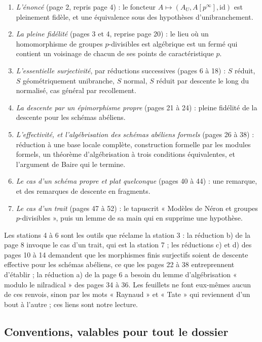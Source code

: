 \documentclass[11pt,a4paper]{article}
\begin{document}
\begin{enumerate}
  \item \emph{L'énoncé} (page 2, repris page 4) : le foncteur
  $A \mapsto (A_U, A[p^\infty], \mathrm{id})$ est pleinement fidèle, et une
  équivalence sous des hypothèses d'unibranchement.
  \item \emph{La pleine fidélité} (pages 3 et 4, reprise page 20) : le lieu où
  un homomorphisme de groupes $p$-divisibles est algébrique est un fermé qui
  contient un voisinage de chacun de ses points de caractéristique $p$.
  \item \emph{L'essentielle surjectivité}, par réductions successives (pages 6
  à 18) : $S$ réduit, $S$ géométriquement unibranche, $S$ normal, $S$ réduit
  par descente le long du normalisé, cas général par recollement.
  \item \emph{La descente par un épimorphisme propre} (pages 21 à 24) : pleine
  fidélité de la descente pour les schémas abéliens.
  \item \emph{L'effectivité, et l'algébrisation des schémas abéliens formels}
  (pages 26 à 38) : réduction à une base locale complète, construction formelle
  par les modules formels, un théorème d'algébrisation à trois conditions
  équivalentes, et l'argument de Baire qui le termine.
  \item \emph{Le cas d'un schéma propre et plat quelconque} (pages 40 à 44) :
  une remarque, et des remarques de descente en fragments.
  \item \emph{Le cas d'un trait} (pages 47 à 52) : le tapuscrit « Modèles de
  Néron et groupes $p$-divisibles », puis un lemme de sa main qui en supprime
  une hypothèse.
\end{enumerate}

Les stations 4 à 6 sont les outils que réclame la station 3 : la réduction b)
de la page 8 invoque le cas d'un trait, qui est la station 7 ; les réductions
c) et d) des pages 10 à 14 demandent que les morphismes finis surjectifs
soient de descente effective pour les schémas abéliens, ce que les pages 22 à
38 entreprennent d'établir ; la réduction a) de la page 6 a besoin du lemme
d'algébrisation « modulo le nilradical » des pages 34 à 36. Les feuillets ne
font eux-mêmes aucun de ces renvois, sinon par les mots « Raynaud » et
« Tate » qui reviennent d'un bout à l'autre ; ces liens sont notre lecture.

\subsection*{Conventions, valables pour tout le dossier}
\end{document}
